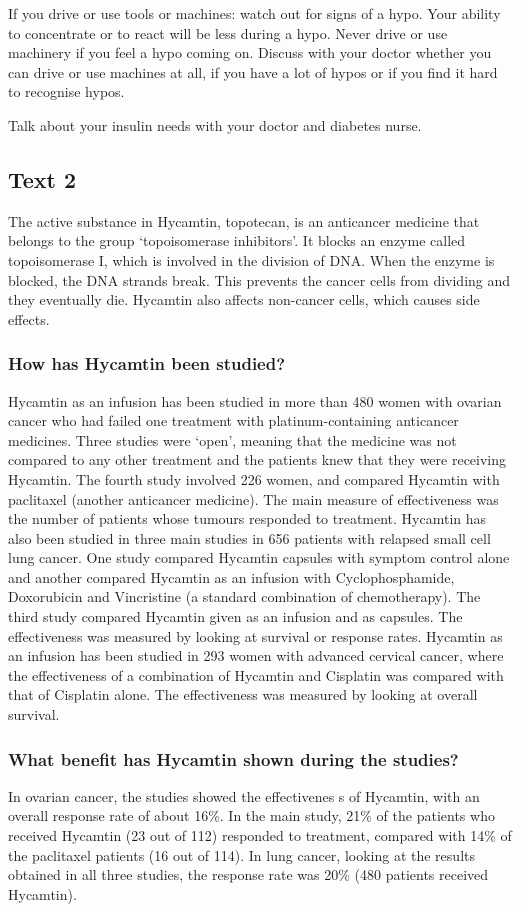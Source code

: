 \documentclass[output=paper]{langsci/langscibook}
\begin{document}
If you drive or use tools or machines: watch out for signs of a hypo. Your ability to concentrate or to react will be less during a hypo. Never drive or use machinery if you feel a hypo coming on. Discuss with your doctor whether you can drive or use machines at all, if you have a lot of hypos or if you find it hard to recognise hypos.

Talk about your insulin needs with your doctor and diabetes nurse.

\subsection*{Text 2}

The active substance in Hycamtin, topotecan, is an anticancer medicine that belongs to the group 
‘topoisomerase inhibitors’. It blocks an enzyme called topoisomerase I, which is involved in the 
division of DNA. When the enzyme is blocked, the DNA strands break. This prevents the cancer cells 
from dividing and they eventually die. Hycamtin also affects non-cancer cells, which causes side 
effects.
\subsubsection*{How has Hycamtin been studied?} 
Hycamtin as an infusion has been studied in more than 480 women with ovarian cancer who had failed one treatment with platinum-containing anticancer medicines. Three studies were ‘open’, meaning that the medicine was not compared to any other treatment and the patients knew that they were receiving Hycamtin. The fourth study involved 226 women, and compared Hycamtin with paclitaxel (another anticancer medicine). The main measure of effectiveness was the number of patients whose tumours responded to treatment. 
Hycamtin has also been studied in three main studies in 656 patients with relapsed small cell lung cancer. One study compared Hycamtin capsules with symptom control alone and another compared Hycamtin as an infusion with Cyclophosphamide, Doxorubicin and Vincristine (a standard combination of chemotherapy). The third study compared Hycamtin given as an infusion and as capsules. The effectiveness was measured by looking at survival or response rates.
Hycamtin as an infusion has been studied in 293 women with advanced cervical cancer, where the effectiveness of a combination of Hycamtin and Cisplatin was compared with that of Cisplatin alone. The effectiveness was measured by looking at overall survival.
\subsubsection*{What benefit has Hycamtin shown during the studies?}
In ovarian cancer, the studies showed the effectivenes
s of Hycamtin, with an overall response rate of about 16\%. In the main study, 21\% of the patients who received Hycamtin (23 out of 112) responded to treatment, compared with 14\% of the paclitaxel patients (16 out of 114). In lung cancer, looking at the results obtained in all three studies, the response rate was 20\% (480 
patients received Hycamtin).
\end{document}
